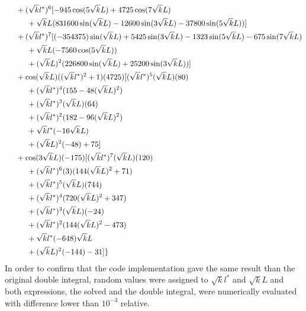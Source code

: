 {\begin{align*}
        &\hspace{0.5cm}+(\sqrt{k}l^*)^6 [-945 \cos(5\sqrt{k}L)+4725 \cos(7\sqrt{k}L)\\
        &\hspace{1cm}     +\sqrt{k}L  (831600 \sin(\sqrt{k}L)-12600 \sin(3\sqrt{k}L)-37800 \sin(5\sqrt{k}L))]\\
        &\hspace{0.5cm}+(\sqrt{k}l^*)^7 [(-354375) \sin(\sqrt{k}L) + 5425 \sin(3\sqrt{k}L)-1323 \sin(5\sqrt{k}L)-675 \sin(7\sqrt{k}L)\\
        &\hspace{1cm}+\sqrt{k}L  (-7560 \cos(5\sqrt{k}L))\\
        &\hspace{1cm}+(\sqrt{k}L)^2 (226800 \sin(\sqrt{k}L) + 25200 \sin(3\sqrt{k}L))]\\
        &\hspace{0.5cm}+\cos(\sqrt{k}L) ((\sqrt{k}l^*)^2+1)(4725)[(\sqrt{k}l^*)^5(\sqrt{k}L)(80)\\
        &\hspace{1cm}     +(\sqrt{k}l^*)^4 (155-48(\sqrt{k}L)^2)\\
        &\hspace{1cm}     +(\sqrt{k}l^*)^3 (\sqrt{k}L)(64)\\
        &\hspace{1cm}     +(\sqrt{k}l^*)^2 (182-96 (\sqrt{k}L)^2)\\
        &\hspace{1cm}     +\sqrt{k}l^*  (-16 \sqrt{k}L)\\
        &\hspace{1cm}     +(\sqrt{k}L)^2 (-48)+75]\\
        &\hspace{0.5cm}+\cos(3\sqrt{k}L) (-175) [(\sqrt{k}l^*)^7 (\sqrt{k}L) (120)\\
        &\hspace{1cm}    +(\sqrt{k}l^*)^6(3)(144(\sqrt{k}L)^2+71)\\
        &\hspace{1cm}    +(\sqrt{k}l^*)^5 (\sqrt{k}L) (744)\\
        &\hspace{1cm}    +(\sqrt{k}l^*)^4 (720(\sqrt{k}L)^2+347)\\
        &\hspace{1cm}    +(\sqrt{k}l^*)^3 (\sqrt{k}L)(-24)\\
        &\hspace{1cm}    +(\sqrt{k}l^*)^2 (144 (\sqrt{k}L)^2-473)\\
        &\hspace{1cm}    +\sqrt{k}l^* (-648) \sqrt{k}L\\
        &\hspace{1cm}    +(\sqrt{k}L)^2 (-144)-31]\}
 \end{align*}
}
In order to confirm that the code implementation gave the same result than the original double integral, random values were assigned to $\sqrt{k}l^*$ and $\sqrt{k}L$ and both expressions, the solved and the double integral, were numerically evaluated with difference lower than $10^{-3}$ relative.\par